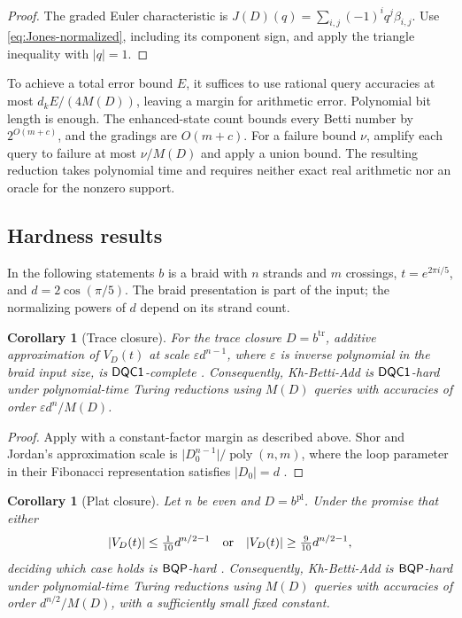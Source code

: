 \documentclass[a4paper,onecolumn,unpublished]{quantumarticle}
\theoremstyle{plain}
\newtheorem{corollary}[theorem]{Corollary}
\theoremstyle{definition}
\theoremstyle{definition}
\numberwithin{equation}{section}
\begin{document}
\begin{proof}
The graded Euler characteristic is
\(J(D)(q)=\sum_{i,j}(-1)^i q^j\beta_{i,j}\).
Use \cref{eq:Jones-normalized}, including its component sign, and apply the triangle inequality with \(|q|=1\).
\end{proof}

To achieve a total error bound \(E\), it suffices to use rational query accuracies at most \(d_k E/(4M(D))\), leaving a margin for arithmetic error. Polynomial bit length is enough. The enhanced-state count bounds every Betti number by \(2^{O(m+c)}\), and the gradings are \(O(m+c)\). For a failure bound \(\nu\), amplify each query to failure at most \(\nu/M(D)\) and apply a union bound. The resulting reduction takes polynomial time and requires neither exact real arithmetic nor an oracle for the nonzero support.

\subsection{Hardness results}

In the following statements \(b\) is a braid with \(n\) strands and \(m\) crossings, \(t=e^{2\pi i/5}\), and \(d=2\cos(\pi/5)\). The braid presentation is part of the input; the normalizing powers of \(d\) depend on its strand count.

\begin{corollary}[Trace closure]
\label{thm:dqc1hard}
For the trace closure \(D=b^{\mathrm{tr}}\), additive approximation of \(V_D(t)\) at scale \(\varepsilon d^{n-1}\), where \(\varepsilon\) is inverse polynomial in the braid input size, is \(\mathsf{DQC1}\)-complete \cite{shor2007estimating}. Consequently, \textsf{Kh-Betti-Add} is \(\mathsf{DQC1}\)-hard under polynomial-time Turing reductions using \(M(D)\) queries with accuracies of order \(\varepsilon d^n/M(D)\).
\end{corollary}

\begin{proof}
Apply  with a constant-factor margin as described above. Shor and Jordan's approximation scale is \(\lvert D_0^{n-1}\rvert/\operatorname{poly}(n,m)\), where the loop parameter in their Fibonacci representation satisfies \(|D_0|=d\) \cite[Section 6]{shor2007estimating}.
\end{proof}

\begin{corollary}[Plat closure]
\label{thm:bqphard}
Let \(n\) be even and \(D=b^{\mathrm{pl}}\). Under the promise that either
\[
 |V_D(t)|\le\tfrac1{10}d^{n/2-1}
 \quad\hbox{or}\quad
 |V_D(t)|\ge\tfrac9{10}d^{n/2-1},
\]
deciding which case holds is \(\mathsf{BQP}\)-hard \cite[Theorem 3.1]{aharonov2011bqp}. Consequently, \textsf{Kh-Betti-Add} is \(\mathsf{BQP}\)-hard under polynomial-time Turing reductions using \(M(D)\) queries with accuracies of order \(d^{n/2}/M(D)\), with a sufficiently small fixed constant.
\end{corollary}
\end{document}
